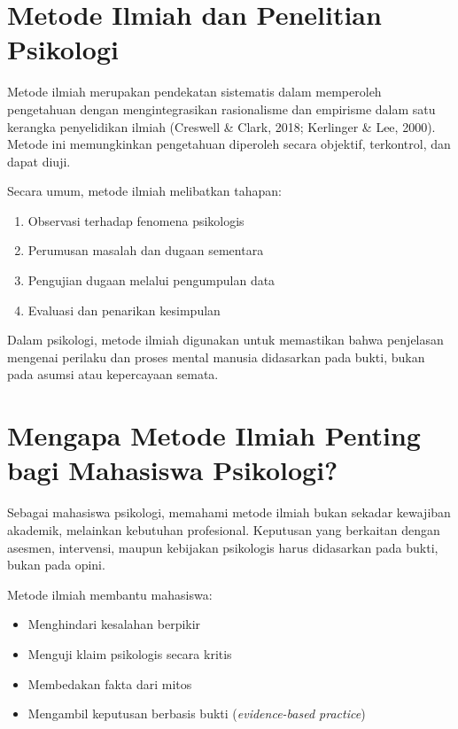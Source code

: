 \documentclass[
  indonesian,
  letterpaper,
  DIV=11,
  numbers=noendperiod]{scrreprt}
\providecommand{\tightlist}{%
  \setlength{\itemsep}{0pt}\setlength{\parskip}{0pt}}
\begin{document}
\section{Metode Ilmiah dan Penelitian
Psikologi}\label{metode-ilmiah-dan-penelitian-psikologi}

Metode ilmiah merupakan pendekatan sistematis dalam memperoleh
pengetahuan dengan mengintegrasikan rasionalisme dan empirisme dalam
satu kerangka penyelidikan ilmiah (Creswell \& Clark, 2018; Kerlinger \&
Lee, 2000). Metode ini memungkinkan pengetahuan diperoleh secara
objektif, terkontrol, dan dapat diuji.

Secara umum, metode ilmiah melibatkan tahapan:

\begin{enumerate}
\def\labelenumi{\arabic{enumi}.}
\tightlist
\item
  Observasi terhadap fenomena psikologis
\item
  Perumusan masalah dan dugaan sementara
\item
  Pengujian dugaan melalui pengumpulan data
\item
  Evaluasi dan penarikan kesimpulan
\end{enumerate}

Dalam psikologi, metode ilmiah digunakan untuk memastikan bahwa
penjelasan mengenai perilaku dan proses mental manusia didasarkan pada
bukti, bukan pada asumsi atau kepercayaan semata.

\section{Mengapa Metode Ilmiah Penting bagi Mahasiswa
Psikologi?}\label{mengapa-metode-ilmiah-penting-bagi-mahasiswa-psikologi}

Sebagai mahasiswa psikologi, memahami metode ilmiah bukan sekadar
kewajiban akademik, melainkan kebutuhan profesional. Keputusan yang
berkaitan dengan asesmen, intervensi, maupun kebijakan psikologis harus
didasarkan pada bukti, bukan pada opini.

Metode ilmiah membantu mahasiswa:

\begin{itemize}
\tightlist
\item
  Menghindari kesalahan berpikir
\item
  Menguji klaim psikologis secara kritis
\item
  Membedakan fakta dari mitos
\item
  Mengambil keputusan berbasis bukti (\emph{evidence-based practice})
\end{itemize}
\end{document}
